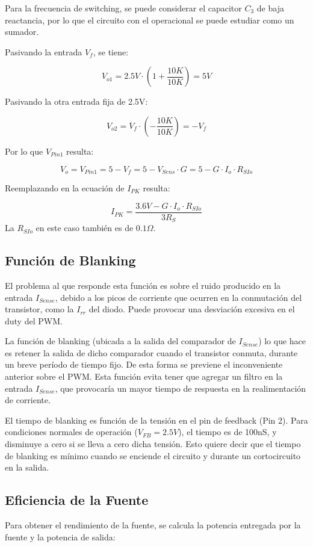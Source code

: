 \documentclass[e4_tp2_main.tex]{subfiles}
\begin{document}
Para la frecuencia de switching, se puede considerar el capacitor $C_3$ de baja reactancia, por lo que el circuito con el operacional se puede estudiar como un sumador.\par
Pasivando la entrada $V_{f}$, se tiene:

\[
V_{o1} = 2.5V \cdot \left(1+ \frac{10K}{10K}\right) = 5V 
\]

Pasivando la otra entrada fija de 2.5V:

\[
V_{o2} = V_{f} \cdot \left(- \frac{10K}{10K} \right) = -V_{f}
\]

Por lo que $V_{Pin1}$ resulta:

\[
V_{o} = V_{Pin1} = 5 - V_{f} = 5 - V_{Sens} \cdot G = 5 - G \cdot I_o \cdot R_{SIo}
\]

Reemplazando en la ecuación de $I_{PK}$ resulta:

\[
I_{PK} = \frac{3.6V - G \cdot I_o \cdot R_{SIo}}{3R_S}
\]
La $R_{SIo}$ en este caso también es de $0.1\Omega$.

\subsection*{Función de Blanking}

El problema al que responde esta función es sobre el ruido producido en la entrada $I_{Sense}$, debido a los picos de corriente que ocurren en la conmutación del transistor, como la $I_{rr}$ del diodo. Puede provocar una desviación excesiva en el duty del PWM.\par
La función de blanking (ubicada a la salida del comparador de $I_{Sense}$) lo que hace es retener la salida de dicho comparador cuando el transistor conmuta, durante un breve período de tiempo fijo. De esta forma se previene el inconveniente anterior sobre el PWM. Esta función evita tener que agregar un filtro en la entrada $I_{Sense}$, que provocaría un mayor tiempo de respuesta en la realimentación de corriente.\par
El tiempo de blanking es función de la tensión en el pin de feedback (Pin 2). Para condiciones normales de operación ($V_{FB} = 2.5V$), el tiempo es de 100nS, y disminuye a cero si se lleva a cero dicha tensión. Esto quiere decir que el tiempo de blanking es mínimo cuando se enciende el circuito y durante un cortocircuito en la salida. 

\subsection*{Eficiencia de la Fuente}
Para obtener el rendimiento de la fuente, se calcula la potencia entregada por la fuente y la potencia de salida:
\end{document}
